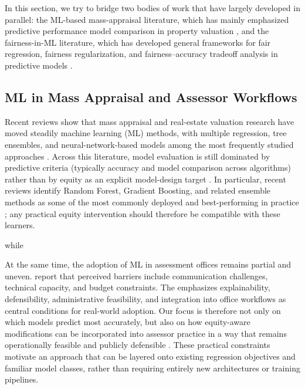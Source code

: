 \documentclass[12pt, draft]{article}
\theoremstyle{plain}
\theoremstyle{definition}
\newcommand{\1}{\mathbf{1}}
\begin{document}
In this section, we try to bridge two bodies of work that have largely developed in parallel: the ML-based mass-appraisal literature, which has mainly emphasized predictive performance model comparison in property valuation \cite{Rootetal2023,Zilli2024}, and the fairness-in-ML literature, which has developed general frameworks for fair regression, fairness regularization, and fairness--accuracy tradeoff analysis in predictive models \cite{CatonHaas2024,AgarwalDudikWu2019,FitzsimonsEtAl2019,lee2022maximal,LiEtAl2022Fairness}. 


\subsection{ML in Mass Appraisal and Assessor Workflows}

Recent reviews show that mass appraisal and real-estate valuation research have moved steadily machine learning (ML) methods, with multiple regression, tree ensembles, and neural-network-based models among the most frequently studied approaches \cite{WangLi2019,Rootetal2023,Zilli2024,purdueAssessingTechniques}. Across this literature, model evaluation is still dominated by predictive criteria (typically accuracy and model comparison across algorithms) rather than by equity as an explicit model-design target \cite{WangLi2019,Rootetal2023,Zilli2024}. In particular, recent reviews identify Random Forest, Gradient Boosting, and related ensemble methods as some of the most commonly deployed and best-performing in practice \cite{Rootetal2023,Sevgen2024100111,Zilli2024}; any practical equity intervention should therefore be compatible with these learners.



 while 


 
At the same time, the adoption of ML in assessment offices remains partial and uneven. \textcite{BidansetRakow2022} report that perceived barriers include communication challenges, technical capacity, and budget constraints. The \textcite{IAAOAITaskForce2022} emphasizes explainability, defensibility, administrative feasibility, and integration into office workflows as central conditions for real-world adoption. Our focus is therefore not only on which models predict most accurately, but also on how equity-aware modifications can be incorporated into assessor practice in a way that remains operationally feasible and publicly defensible \cite{IAAOAITaskForce2022,BidansetRakow2022}. These practical constraints motivate an approach that can be layered onto existing regression objectives and familiar model classes, rather than requiring entirely new architectures or training pipelines.
\end{document}
